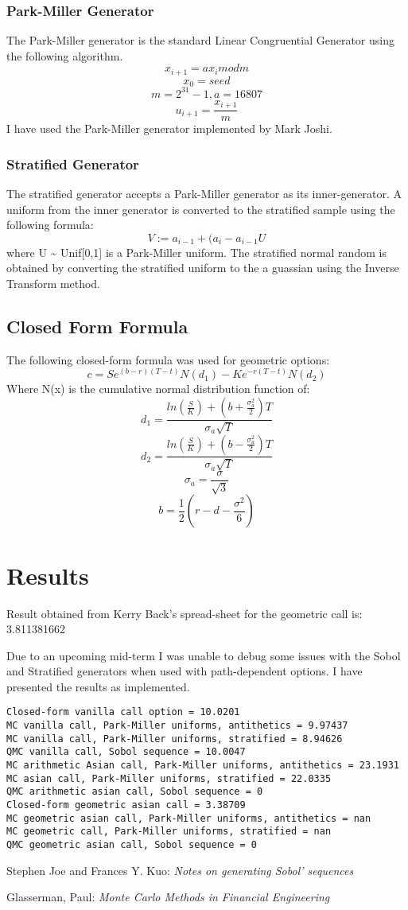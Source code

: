 \documentclass[letterpaper,twoside,11pt,fleqn]{article}
\begin{document}
\subsubsection*{Park-Miller Generator}
The Park-Miller generator is the standard Linear Congruential Generator using the following algorithm.
\[
x_{i+1} = a x_i mod m
\]
\[ x_0 = seed \]
\[ m = 2^{31} - 1, a = 16807 \]
\[
u_{i+1} = \frac{x_{i+1}}{m}
\]
I have used the Park-Miller generator implemented by Mark Joshi.

\subsubsection*{Stratified Generator}
The stratified generator accepts a Park-Miller generator as its inner-generator.  A uniform from the inner generator is converted to the stratified sample using the following formula:
\[
V := a_{i-1} + (a_i - a_{i-1}U
\]
where U \textasciitilde{} Unif[0,1]  is a Park-Miller uniform.  The stratified normal random is obtained by converting the stratified uniform to the a guassian using the Inverse Transform method.

\subsection*{Closed Form Formula}
The following closed-form formula was used for geometric options:
\[
c = Se^{(b-r)(T-t)}N(d_1) - Ke^{-r(T-t)}N(d_2)
\]
Where N(x) is the cumulative normal distribution function of:
\[
d_1 = \frac{ln(\frac{S}{K}) + (b + \frac{\sigma_a^2}{2})T}{\sigma_a \sqrt{T}}
\]
\[
d_2 = \frac{ln(\frac{S}{K}) + (b - \frac{\sigma_a^2}{2})T}{\sigma_a \sqrt{T}}
\]
\[
\sigma_a = \frac{\sigma}{\sqrt{3}}
\]
\[
b = \frac{1}{2}(r - d - \frac{\sigma^2}{6})
\]


\section*{Results}

Result obtained from Kerry Back's spread-sheet for the geometric call is: 3.811381662

Due to an upcoming mid-term I was unable to debug some issues with the Sobol and Stratified generators when used with path-dependent options. I have presented the results as implemented.

\begin{verbatim}
Closed-form vanilla call option = 10.0201
MC vanilla call, Park-Miller uniforms, antithetics = 9.97437
MC vanilla call, Park-Miller uniforms, stratified = 8.94626
QMC vanilla call, Sobol sequence = 10.0047
MC arithmetic Asian call, Park-Miller uniforms, antithetics = 23.1931
MC asian call, Park-Miller uniforms, stratified = 22.0335
QMC arithmetic asian call, Sobol sequence = 0
Closed-form geometric asian call = 3.38709
MC geometric asian call, Park-Miller uniforms, antithetics = nan
MC geometric call, Park-Miller uniforms, stratified = nan
QMC geometric asian call, Sobol sequence = 0
\end{verbatim}


\begin{thebibliography}{1}
	Stephen Joe and Frances Y. Kuo:
	{\em Notes on generating Sobol' sequences}

	Glasserman, Paul:
	{\em Monte Carlo Methods in Financial Engineering}

\end{thebibliography}
\end{document}
